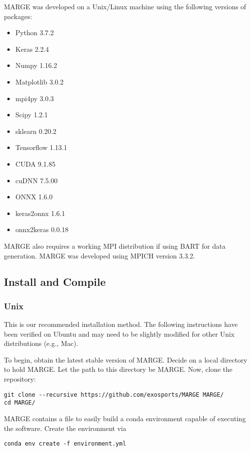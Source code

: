 \documentclass[letterpaper, 12pt]{article}
\begin{document}
\noindent MARGE was developed on a Unix/Linux machine using the following 
versions of packages:

\begin{itemize}
\item Python 3.7.2
\item Keras 2.2.4
\item Numpy 1.16.2
\item Matplotlib 3.0.2
\item mpi4py 3.0.3
\item Scipy 1.2.1
\item sklearn 0.20.2
\item Tensorflow 1.13.1
\item CUDA 9.1.85
\item cuDNN 7.5.00
\item ONNX 1.6.0
\item keras2onnx 1.6.1
\item onnx2keras 0.0.18
\end{itemize}

\noindent MARGE also requires a working MPI distribution if using BART for 
data generation.  MARGE was developed using MPICH version 3.3.2.



\subsection{Install and Compile}
\label{sec:install}

\subsubsection{Unix}

\noindent This is our recommended installation method.  The following 
instructions have been verified on Ubuntu and may need to be slightly modified 
for other Unix distributions (e.g., Mac).

\noindent To begin, obtain the latest stable version of MARGE.  Decide on a 
local directory to hold MARGE.  Let the path to this directory be 
MARGE. Now, clone the repository:
\begin{verbatim}
git clone --recursive https://github.com/exosports/MARGE MARGE/
cd MARGE/
\end{verbatim}

\noindent MARGE contains a file to easily build a conda environment capable of 
executing the software.  Create the environment via
\begin{verbatim}
conda env create -f environment.yml
\end{verbatim}
\end{document}
